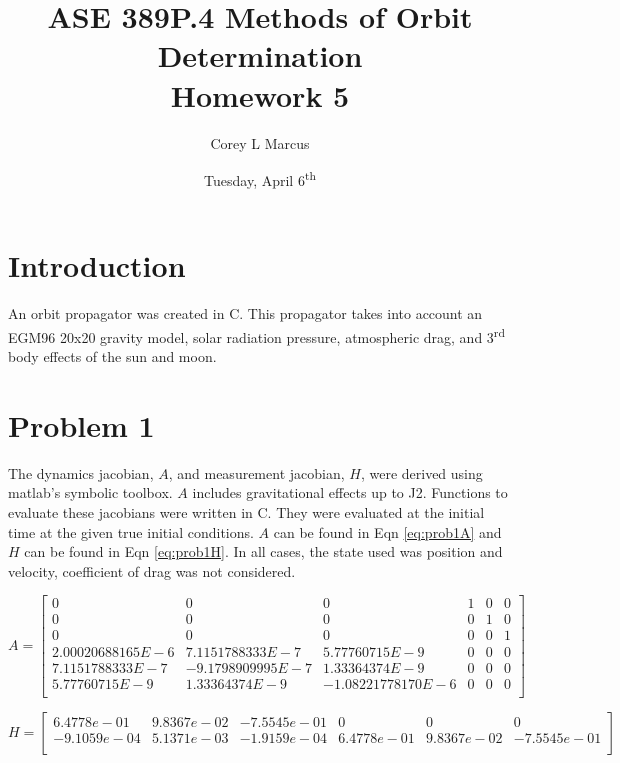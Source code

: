 \documentclass[11pt]{article}
\title{ASE 389P.4 Methods of Orbit Determination \\ Homework 5}
\author{Corey L Marcus} \date{Tuesday, April 6\textsuperscript{th}}
\def\CC{{C\nolinebreak[4]\hspace{-.05em}\raisebox{.4ex}{\tiny\bf ++}}}
\begin{document}
\onehalfspace
\maketitle


\section{Introduction}

An orbit propagator was created in \CC. This propagator takes into account an EGM96 20x20 gravity model, solar radiation pressure, atmospheric drag, and 3\textsuperscript{rd} body effects of the sun and moon. \\

\section{Problem 1}

The dynamics jacobian, $A$, and measurement jacobian, $H$, were derived using matlab's symbolic toolbox. $A$ includes gravitational effects up to J2. Functions to evaluate these jacobians were written in \CC. They were evaluated at the initial time at the given true initial conditions. $A$ can be found in Eqn \eqref{eq:prob1A} and $H$ can be found in Eqn \eqref{eq:prob1H}. In all cases, the state used was position and velocity, coefficient of drag was not considered.

\begin{equation}
\label{eq:prob1A}
A = \begin{bmatrix}
	0 & 0 & 0 & 1 & 0 & 0 \\
	0 & 0 & 0 & 0 & 1 & 0 \\
	0 & 0 & 0 & 0 & 0 & 1 \\
	2.00020688165E-6 & 7.1151788333E-7 & 5.77760715E-9 & 0 & 0 & 0 \\
	7.1151788333E-7 & -9.1798909995 E-7 & 1.33364374E-9 & 0 & 0 & 0 \\
	5.77760715E-9 & 1.33364374E-9 & -1.08221778170E-6 & 0 & 0 & 0 \\
\end{bmatrix}
\end{equation}

\begin{equation}
\label{eq:prob1H}
H = \begin{bmatrix}
6.4778e-01  & 9.8367e-02 & -7.5545e-01     &       0       &     0     &       0 \\
-9.1059e-04 &  5.1371e-03 &  -1.9159e-04  & 6.4778e-01 &  9.8367e-02 &  -7.5545e-01 \\
\end{bmatrix}
\end{equation}
\end{document}
